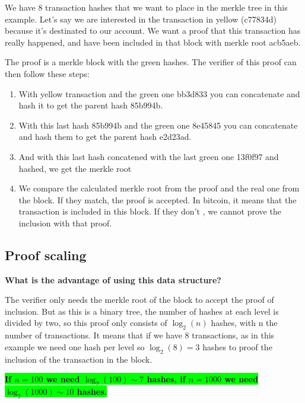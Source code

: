 We have 8 transaction hashes that we want to place in the merkle tree in this example. Let's say we are interested in the transaction in yellow (c77834d) because it's destinated to our account. We want a proof that this transaction has really happened, and have been included in that block with merkle root acb5aeb. 

The proof is a merkle block with the green hashes. The verifier of this proof can then follow these steps:
\begin{enumerate}
    \item With yellow transaction and the green one bb3d833 you can concatenate and hash it to get the parent hash 85b994b.
    \item With this last hash 85b994b and the green one 8e45845 you can concatenate and hash them to get the parent hash e2d23ad.
    \item And with this last hash concatened with the last green one 13f0f97 and hashed, we get the merkle root
    \item We compare the calculated merkle root from the proof and the real one from the block. If they match, the proof is accepted.
    In bitcoin, it means that the transaction is included in this block. If they don't , we cannot prove the inclusion with that proof. 
\end{enumerate} 
\subsection{Proof scaling}
\textbf{
What is the advantage of using this data structure?}

The verifier only needs the merkle root of the block to accept the proof of inclusion. But as this is a binary tree, the number of hashes at each level is divided by two, so this proof only consists of $\log_2(n)$ hashes, with n the number of transactions. 
It means that if we have 8 transactions, as in this example we  need one hash per level so $\log_2(8)=3$ hashes to proof the inclusion of the transaction in the block.

\colorbox{lime}{
\textbf{
If $n=100$ we need $\log_2(100)\sim 7$ hashes, if $n=1000$ we need $\log_2(1000)\sim 10$ hashes.
}
}

